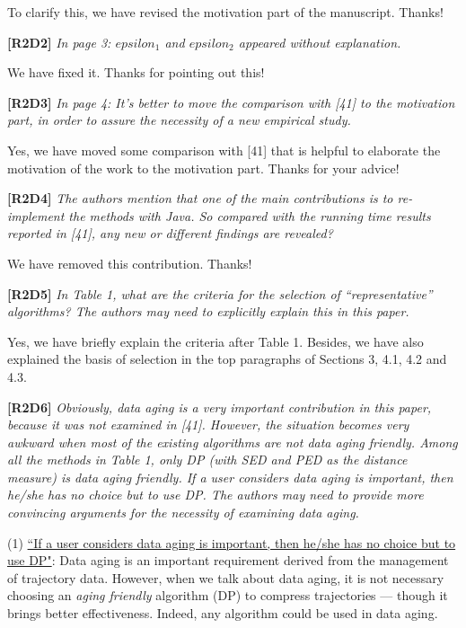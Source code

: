 \documentclass{letter}
\begin{document}
To clarify this, we have revised the motivation part of the manuscript. Thanks!

\textbf{[R2D2]} \emph{In page 3: $epsilon_1$ and $epsilon_2$ appeared without explanation.}

We have fixed it. Thanks for pointing out this!

\textbf{[R2D3]} \emph{ In page 4: It’s better to move the comparison with [41] to the motivation part, in order to assure the necessity of a new empirical study.}

Yes, we have moved some comparison with [41] that is helpful to elaborate the motivation of the work to the motivation part. Thanks for your advice!

\textbf{[R2D4]} \emph{The authors mention that one of the main contributions is to re-implement the methods with Java. So compared with the running time results reported in [41], any new or different findings are revealed?}

We have removed this contribution. Thanks!


\textbf{[R2D5]} \emph{In Table 1, what are the criteria for the selection of “representative” algorithms? The authors may need to explicitly explain this in this paper.}

Yes, we have briefly explain the criteria after Table 1. Besides, we have also explained the basis of selection in the top paragraphs of Sections 3, 4.1, 4.2 and 4.3.

\textbf{[R2D6]} \emph{Obviously, data aging is a very important contribution in this paper, because it was not examined in [41]. However, the situation becomes very awkward when most of the existing algorithms are not data aging friendly. Among all the methods in Table 1, only DP (with SED and PED as the distance measure) is data aging friendly. If a user considers data aging is important, then he/she has no choice but to use DP. The authors may need to provide more convincing arguments for the necessity of examining data aging.}

(1) \underline{``If a user considers data aging is important, then he/she has no choice but to use DP"}: Data aging is an important requirement derived from the management of trajectory data. However, when we talk about data aging, it is not necessary choosing an \emph{aging friendly} algorithm (DP) to compress trajectories --- though it brings better effectiveness. Indeed, any algorithm could be used in data aging.
\end{document}
